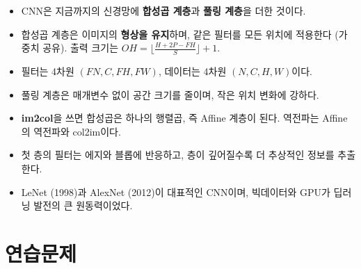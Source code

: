 \documentclass[11pt,a4paper]{article}
\begin{document}
\begin{keybox}
\begin{itemize}[leftmargin=1.5em]
\item CNN은 지금까지의 신경망에 \textbf{합성곱 계층}과 \textbf{풀링 계층}을 더한 것이다.
\item 합성곱 계층은 이미지의 \textbf{형상을 유지}하며, 같은 필터를 모든 위치에 적용한다 (가중치 공유).
출력 크기는 $OH=\lfloor\frac{H+2P-FH}{S}\rfloor+1$.
\item 필터는 4차원 $(FN,C,FH,FW)$, 데이터는 4차원 $(N,C,H,W)$이다.
\item 풀링 계층은 매개변수 없이 공간 크기를 줄이며, 작은 위치 변화에 강하다.
\item \textbf{im2col}을 쓰면 합성곱은 하나의 행렬곱, 즉 Affine 계층이 된다. 역전파는 Affine의 역전파와 col2im이다.
\item 첫 층의 필터는 에지와 블롭에 반응하고, 층이 깊어질수록 더 추상적인 정보를 추출한다.
\item LeNet (1998)과 AlexNet (2012)이 대표적인 CNN이며, 빅데이터와 GPU가 딥러닝 발전의 큰 원동력이었다.
\end{itemize}
\end{keybox}

\section{연습문제}
\end{document}
